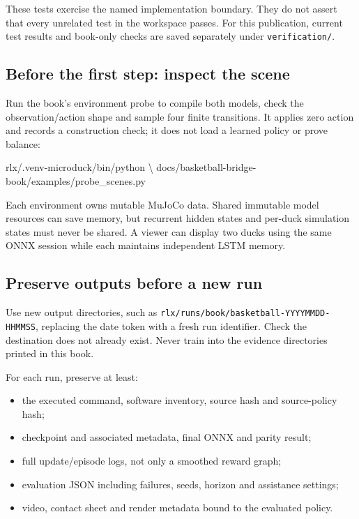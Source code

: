 \documentclass[
  american,
  11pt,
  letterpaper,
]{article}
\newenvironment{Shaded}{\begin{snugshade}}{\end{snugshade}}
\newcommand{\DataTypeTok}[1]{\textcolor[rgb]{0.13,0.29,0.53}{#1}}
\newcommand{\ExtensionTok}[1]{#1}
\newcommand{\NormalTok}[1]{#1}
\providecommand{\tightlist}{%
  \setlength{\itemsep}{0pt}\setlength{\parskip}{0pt}}
\renewenvironment{Shaded}{\par\smallskip}{\par\smallskip}
\begin{document}
These tests exercise the named implementation boundary. They do not
assert that every unrelated test in the workspace passes. For this
publication, current test results and book-only checks are saved
separately under \texttt{verifica\allowbreak{}tion/\allowbreak{}}.

\subsection{Before the first step: inspect the
scene}\label{before-the-first-step-inspect-the-scene}

Run the book's environment probe to compile both models, check the
observation/action shape and sample four finite transitions. It applies
zero action and records a construction check; it does not load a learned
policy or prove balance:

\begin{Shaded}
\begin{Highlighting}[]
\ExtensionTok{rlx/.venv{-}microduck/bin/python} \DataTypeTok{\textbackslash{}}
\NormalTok{  docs/basketball{-}bridge{-}book/examples/probe\_scenes.py}
\end{Highlighting}
\end{Shaded}

Each environment owns mutable MuJoCo data. Shared immutable model
resources can save memory, but recurrent hidden states and per-duck
simulation states must never be shared. A viewer can display two ducks
using the same ONNX session while each maintains independent LSTM
memory.

\subsection{Preserve outputs before a new
run}\label{preserve-outputs-before-a-new-run}

Use new output directories, such as
\texttt{rlx/\allowbreak{}runs/\allowbreak{}book/\allowbreak{}basketba\allowbreak{}ll-\allowbreak{}YYYYMMDD\allowbreak{}-\allowbreak{}HHMMSS},
replacing the date token with a fresh run identifier. Check the
destination does not already exist. Never train into the evidence
directories printed in this book.

For each run, preserve at least:

\begin{itemize}
\tightlist
\item
  the executed command, software inventory, source hash and
  source-policy hash;
\item
  checkpoint and associated metadata, final ONNX and parity result;
\item
  full update/episode logs, not only a smoothed reward graph;
\item
  evaluation JSON including failures, seeds, horizon and assistance
  settings;
\item
  video, contact sheet and render metadata bound to the evaluated
  policy.
\end{itemize}
\end{document}
